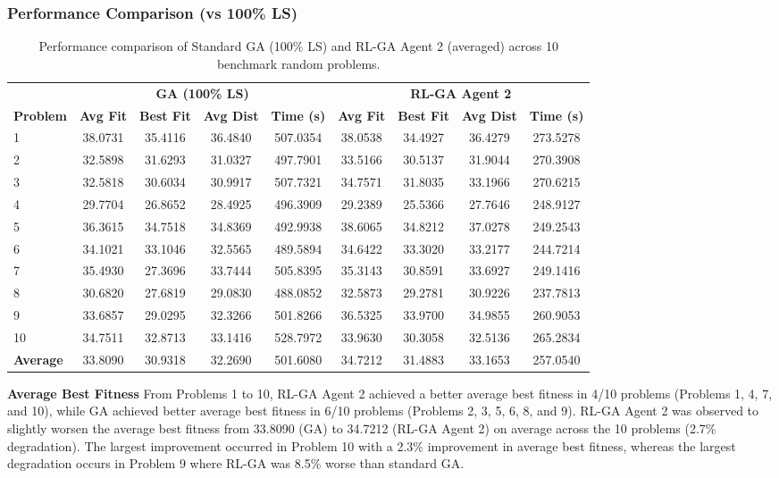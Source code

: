 \documentclass{article}
\begin{document}
\subsubsection{Performance Comparison (vs 100\% LS)}
\begin{table}[H]
\centering
\small
\begin{tabular}{lcccccccc}
\toprule
& \multicolumn{4}{c}{\textbf{GA (100\% LS)}} & \multicolumn{4}{c}{\textbf{RL-GA Agent 2}} \\
\cmidrule(lr){2-5} \cmidrule(lr){6-9}
\textbf{Problem} & \textbf{Avg Fit} & \textbf{Best Fit} & \textbf{Avg Dist} & \textbf{Time (s)}
& \textbf{Avg Fit} & \textbf{Best Fit} & \textbf{Avg Dist} & \textbf{Time (s)} \\
\midrule
1  & 38.0731 & 35.4116 & 36.4840 & 507.0354 & 38.0538 & 34.4927 & 36.4279 & 273.5278 \\
2  & 32.5898 & 31.6293 & 31.0327 & 497.7901 & 33.5166 & 30.5137 & 31.9044 & 270.3908 \\
3  & 32.5818 & 30.6034 & 30.9917 & 507.7321 & 34.7571 & 31.8035 & 33.1966 & 270.6215 \\
4  & 29.7704 & 26.8652 & 28.4925 & 496.3909 & 29.2389 & 25.5366 & 27.7646 & 248.9127 \\
5  & 36.3615 & 34.7518 & 34.8369 & 492.9938 & 38.6065 & 34.8212 & 37.0278 & 249.2543 \\
6  & 34.1021 & 33.1046 & 32.5565 & 489.5894 & 34.6422 & 33.3020 & 33.2177 & 244.7214 \\
7  & 35.4930 & 27.3696 & 33.7444 & 505.8395 & 35.3143 & 30.8591 & 33.6927 & 249.1416 \\
8  & 30.6820 & 27.6819 & 29.0830 & 488.0852 & 32.5873 & 29.2781 & 30.9226 & 237.7813 \\
9  & 33.6857 & 29.0295 & 32.3266 & 501.8266 & 36.5325 & 33.9700 & 34.9855 & 260.9053 \\
10 & 34.7511 & 32.8713 & 33.1416 & 528.7972 & 33.9630 & 30.3058 & 32.5136 & 265.2834 \\
\midrule
\textbf{Average} & 33.8090 & 30.9318 & 32.2690 & 501.6080 & 34.7212 & 31.4883 & 33.1653 & 257.0540 \\
\bottomrule
\end{tabular}
\caption{Performance comparison of Standard GA (100\% LS) and RL-GA Agent 2 (averaged) across 10 benchmark random problems.}
\label{tab:rlga_ga100_corrected}
\end{table}

\textbf{Average Best Fitness} \newline
From Problems 1 to 10, RL-GA Agent 2 achieved a better average best fitness in 4/10 problems (Problems 1, 4, 7, and 10), while GA achieved better average best fitness in 6/10 problems (Problems 2, 3, 5, 6, 8, and 9).
RL-GA Agent 2 was observed to slightly worsen the average best fitness from 33.8090 (GA) to 34.7212 (RL-GA Agent 2) on average across the 10 problems (2.7\% degradation). The largest improvement occurred in Problem 10 with a 2.3\% improvement in average best fitness, whereas the largest degradation occurs in Problem 9 where RL-GA was 8.5\% worse than standard GA.
\end{document}
